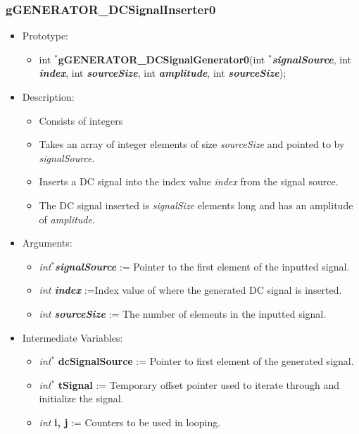 \documentclass{article}
\begin{document}
{{{%
\cleardoublepage
\subsubsection{gGENERATOR\_DCSignalInserter0}
{\renewcommand{\labelitemi}{$\bullet$}
\begin{itemize}
\item Prototype:
	\begin{itemize}
	\item int $^{\ast}$\textbf{gGENERATOR\_DCSignalGenerator0}(int $^{\ast}$\textit{\textbf{signalSource}}, int \textit{\textbf{index}}, int \textit{\textbf{sourceSize}}, int \textit{\textbf{amplitude}}, int \textit{\textbf{sourceSize}});
	\end{itemize}
\item Description:
	\begin{itemize}[noitemsep]
	\item Consists of integers
	\item Takes an array of integer elements of size \textit{sourceSize} and pointed to by \textit{signalSource}.
	\item Inserts a DC signal into the index value \textit{index} from the signal source.
	\item The DC signal inserted is \textit{signalSize} elements long and has an amplitude of \textit{amplitude}.
	\end{itemize}
\item Arguments:
	\begin{itemize}[noitemsep]
	\item \textit{int$^{\ast}$\textbf{signalSource}} := Pointer to the first element of the inputted signal.
	\item \textit{int \textbf{index}} :=Index value of where the generated DC signal is inserted.
	\item \textit{int \textbf{sourceSize}} := The number of elements in the inputted signal.
	\end{itemize} 
\item Intermediate Variables:
	\begin{itemize}[noitemsep]
	\item \textit{int$^{\ast}$} \textbf{dcSignalSource} := Pointer to first element of the generated signal.
	\item \textit{int$^{\ast}$} \textbf{tSignal} := Temporary offset pointer used to iterate through and initialize the signal.
	\item \textit{int} \textbf{i, j} := Counters to be used in looping.

\end{itemize}
\end{itemize}}}}}
\end{document}
